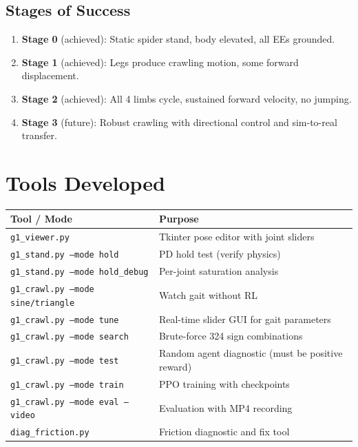 \documentclass[11pt, a4paper]{article}
\begin{document}

\subsection{Stages of Success}

\begin{enumerate}[nosep]
\item \textbf{Stage 0} (achieved): Static spider stand, body elevated, all EEs grounded.
\item \textbf{Stage 1} (achieved): Legs produce crawling motion, some forward displacement.
\item \textbf{Stage 2} (achieved): All 4 limbs cycle, sustained forward velocity, no jumping.
\item \textbf{Stage 3} (future): Robust crawling with directional control and sim-to-real transfer.
\end{enumerate}

\section{Tools Developed}

\begin{table}[H]
\centering\small
\begin{tabularx}{\textwidth}{lX}
\toprule
\textbf{Tool / Mode} & \textbf{Purpose} \\
\midrule
\texttt{g1\_viewer.py} & Tkinter pose editor with joint sliders \\
\texttt{g1\_stand.py --mode hold} & PD hold test (verify physics) \\
\texttt{g1\_stand.py --mode hold\_debug} & Per-joint saturation analysis \\
\texttt{g1\_crawl.py --mode sine/triangle} & Watch gait without RL \\
\texttt{g1\_crawl.py --mode tune} & Real-time slider GUI for gait parameters \\
\texttt{g1\_crawl.py --mode search} & Brute-force 324 sign combinations \\
\texttt{g1\_crawl.py --mode test} & Random agent diagnostic (must be positive reward) \\
\texttt{g1\_crawl.py --mode train} & PPO training with checkpoints \\
\texttt{g1\_crawl.py --mode eval --video} & Evaluation with MP4 recording \\
\texttt{diag\_friction.py} & Friction diagnostic and fix tool \\
\bottomrule
\end{tabularx}
\end{table}
\end{document}
